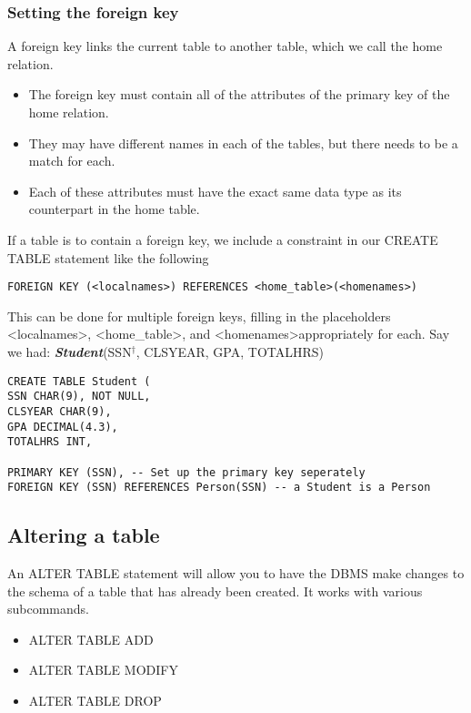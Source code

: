 \documentclass{report}
\begin{document}
\subsubsection*{Setting the foreign key}
A foreign key links the current table to another table, which we call the home relation.
\begin{itemize}
    \item The foreign key must contain all of the attributes of the primary key of the home relation.
    \item They may have different names in each of the tables, but there needs to be a match for each.
    \item Each of these attributes must have the exact same data type as its counterpart in the home table.
\end{itemize}
If a table is to contain a foreign key, we include a constraint in our CREATE TABLE statement like the following
\begin{verbatim}
FOREIGN KEY (<localnames>) REFERENCES <home_table>(<homenames>)
\end{verbatim}
This can be done for multiple foreign keys, filling in the placeholders \textless localnames\textgreater, \textless home\_table\textgreater, and \textless homenames\textgreater appropriately for each.
\bigbreak \noindent
Say we had: \textit{\textbf{Student}}(SSN$^\dag$, CLSYEAR, GPA, TOTALHRS)
\begin{verbatim}
CREATE TABLE Student (
SSN CHAR(9), NOT NULL,
CLSYEAR CHAR(9),
GPA DECIMAL(4.3), 
TOTALHRS INT,

PRIMARY KEY (SSN), -- Set up the primary key seperately
FOREIGN KEY (SSN) REFERENCES Person(SSN) -- a Student is a Person
\end{verbatim}
\subsection{Altering a table}
An ALTER TABLE statement will allow you to have the DBMS make changes to the schema of a table that has already been created. It works with various subcommands.
\begin{itemize}
    \item ALTER TABLE ADD
    \item ALTER TABLE MODIFY
    \item ALTER TABLE DROP
\end{itemize}
\end{document}

